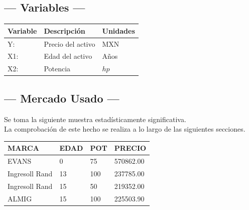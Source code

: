 \subsection{\centering --- Variables ---} %
\begin{center}
  \begin{tabular}{|l|l|l|}
    \hline 
    Variable & Descripción   & Unidades\\ \hline 
    Y:  & Precio del activo  & MXN \\ \hline 
    X1: & Edad del activo    & Años \\ \hline 
		X2: & Potencia  & \(hp\) \\ \hline 
  \end{tabular}
\end{center} 

\subsection{\centering --- Mercado Usado ---} %
Se toma la siguiente muestra estadísticamente significativa. \\ 
La comprobación de este hecho se realiza a lo largo de las siguientes secciones.
\begin{center}
	\begin{tabular}{*{4}{|p{2cm}}|}
		\hline 
MARCA          &  EDAD  & POT  & PRECIO\\ \hline
EVANS          &  0     & 75   & 570862.00\\ \hline
Ingresoll Rand &  13    & 100  & 237785.00\\ \hline
Ingresoll Rand &  15    & 50   & 219352.00\\ \hline
ALMIG          &  15    & 100  & 225503.90\\ \hline
	\end{tabular}
\end{center}

